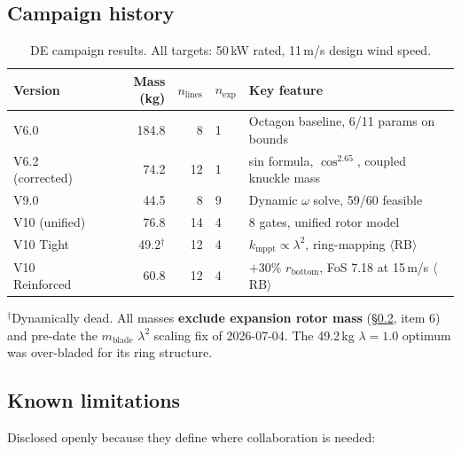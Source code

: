\documentclass[11pt,a4paper]{article}
\newcommand{\RB}{$\langle$RB$\rangle$}  %
\begin{document}
\subsection{Campaign history}

\begin{table}[htbp]
\centering
\caption{DE campaign results. All targets: 50\,kW rated, 11\,m/s design wind speed.}
\label{tab:campaigns}
\begin{tabular}{@{}lrrll@{}}
\toprule
Version & Mass (kg) & $n_{\text{lines}}$ & $n_{\text{exp}}$ & Key feature \\
\midrule
V6.0 & 184.8 & 8 & 1 & Octagon baseline, 6/11 params on bounds \\
V6.2 (corrected) & 74.2 & 12 & 1 & sin formula, $\cos^{2.65}$, coupled knuckle mass \\
V9.0 & 44.5 & 8 & 9 & Dynamic $\omega$ solve, 59/60 feasible \\
V10 (unified) & 76.8 & 14 & 4 & 8 gates, unified rotor model \\
V10 Tight & 49.2$^\dagger$ & 12 & 4 & $k_{\text{mppt}} \propto \lambda^2$, ring-mapping \RB \\
V10 Reinforced & 60.8 & 12 & 4 & $+$30\% $r_{\text{bottom}}$, FoS 7.18 at 15\,m/s \RB \\
\bottomrule
\end{tabular}
\vspace{4pt}

\footnotesize
$^\dagger$Dynamically dead.
All masses \textbf{exclude expansion rotor mass} (\S\ref{sec:limitations}, item 6)
and pre-date the $m_{\text{blade}}$ $\lambda^2$ scaling fix of 2026-07-04.
The 49.2\,kg $\lambda = 1.0$ optimum was over-bladed for its ring structure.
\normalsize
\end{table}

\subsection{Known limitations}
\label{sec:limitations}

Disclosed openly because they define where collaboration is needed:
\end{document}
